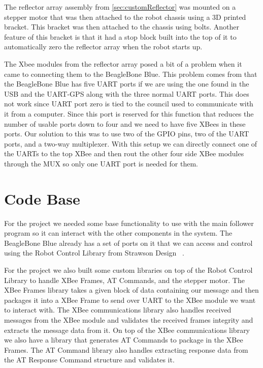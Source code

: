 \vspace*{12pt}
\noindent
The reflector array assembly from \autoref{sec:customReflector} was mounted on a stepper motor that was then attached to the robot chassis using a 3D printed bracket. This bracket was then attached to the chassis using bolts. Another feature of this bracket is that it had a stop block built into the top of it to automatically zero the reflector array when the robot starts up.

\vspace*{12pt}
\noindent
The Xbee modules from the reflector array posed a bit of a problem when it came to connecting them to the BeagleBone Blue. This problem comes from that the BeagleBone Blue has five UART ports if we are using the one found in the USB and the UART-GPS along with the three normal UART ports. This does not work since UART port zero is tied to the council used to communicate with it from a computer. Since this port is reserved for this function that reduces the number of usable ports down to four and we need to have five XBees in these ports. Our solution to this was to use two of the GPIO pins, two of the UART ports, and a two-way multiplexer. With this setup we can directly connect one of the UARTs to the top XBee and then rout the other four side XBee modules through the MUX so only one UART port is needed for them.


\section{Code Base}
\label{sec:Code Base}

For the project we needed some base functionality to use with the main follower program so it can interact with the other components in the system. The BeagleBone Blue already has a set of ports on it that we can access and control using the Robot Control Library from Strawson Design ~\cite{Robot_Control_Library}.

\vspace*{12pt}
\noindent
For the project we also built some custom libraries on top of the Robot Control Library to handle XBee Frames, AT Commands, and the stepper motor. The XBee Frames library takes a given block of data containing our message and then packages it into a XBee Frame to send over UART to the XBee module we want to interact with. The XBee communications library also handles received messages from the XBee module and validates the received frames integrity and extracts the message data from it. On top of the XBee communications library we also have a library that generates AT Commands to package in the XBee Frames. The AT Command library also handles extracting response data from the AT Response Command structure and validates it.

